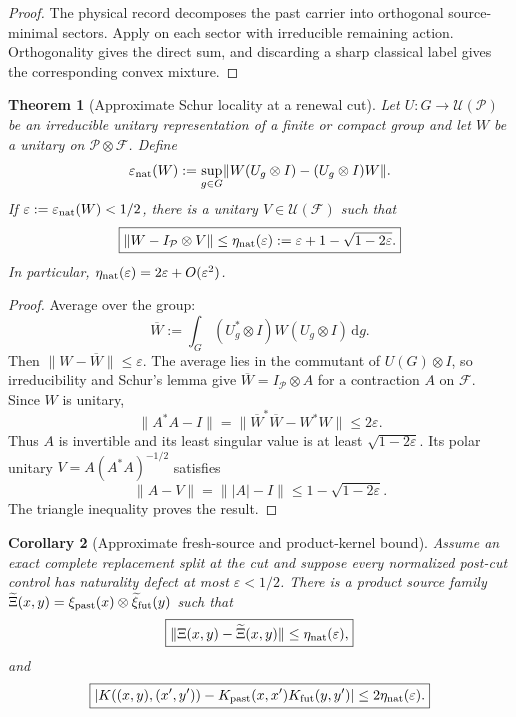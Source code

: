 \documentclass[11pt]{article}
\newtheorem{theorem}{Theorem}[section]
\newtheorem{corollary}[theorem]{Corollary}
\theoremstyle{definition}
\theoremstyle{remark}
\newcommand{\norm}[1]{\lVert#1\rVert}
\newcommand{\dd}{\mathrm d}
\begin{document}
\begin{proof}
The physical record decomposes the past carrier into orthogonal source-minimal
sectors.  Apply  on each sector with
irreducible remaining action.  Orthogonality gives the direct sum, and
discarding a sharp classical label gives the corresponding convex mixture.
\end{proof}

\begin{theorem}[Approximate Schur locality at a renewal cut]
\label{thm:approximate-cut-locality-master}
Let $U:G\to\mathcal U(\mathcal P)$ be an irreducible unitary representation of
a finite or compact group and let $W$ be a unitary on
$\mathcal P\otimes\mathcal F$.  Define
\[
  \varepsilon_{\rm nat}(W)
  :=\sup_{g\in G}
  \norm{W(U_g\otimes I)-(U_g\otimes I)W}.
\]
If $\varepsilon:=\varepsilon_{\rm nat}(W)<1/2$, there is a unitary
$V\in\mathcal U(\mathcal F)$ such that
\begin{equation}
  \boxed{
  \norm{W-I_{\mathcal P}\otimes V}
  \le
  \eta_{\rm nat}(\varepsilon)
  :=\varepsilon+1-\sqrt{1-2\varepsilon}.}
  \label{eq:approximate-cut-locality-master}
\end{equation}
In particular, $\eta_{\rm nat}(\varepsilon)=2\varepsilon+O(\varepsilon^2)$.
\end{theorem}

\begin{proof}
Average over the group:
\[
  \overline W
  :=\int_G(U_g^*\otimes I)W(U_g\otimes I)\,\dd g.
\]
Then $\norm{W-\overline W}\le\varepsilon$.  The average lies in the
commutant of $U(G)\otimes I$, so irreducibility and Schur's lemma give
$\overline W=I_{\mathcal P}\otimes A$ for a contraction $A$ on $\mathcal F$.
Since $W$ is unitary,
\[
  \norm{A^*A-I}
  =\norm{\overline W^*\overline W-W^*W}
  \le2\varepsilon.
\]
Thus $A$ is invertible and its least singular value is at least
$\sqrt{1-2\varepsilon}$.  Its polar unitary
$V=A(A^*A)^{-1/2}$ satisfies
\[
  \norm{A-V}=\norm{|A|-I}
  \le1-\sqrt{1-2\varepsilon}.
\]
The triangle inequality proves the result.
\end{proof}

\begin{corollary}[Approximate fresh-source and product-kernel bound]
\label{cor:approximate-cut-product-master}
Assume an exact complete replacement split at the cut and suppose every
normalized post-cut control has naturality defect at most
$\varepsilon<1/2$.  There is a product source family
$\widetilde\Xi(x,y)=\xi_{\rm past}(x)\otimes
\widetilde\xi_{\rm fut}(y)$ such that
\begin{equation}
  \boxed{\norm{\Xi(x,y)-\widetilde\Xi(x,y)}
  \le\eta_{\rm nat}(\varepsilon),}
  \label{eq:approximate-source-product-master}
\end{equation}
and
\begin{equation}
  \boxed{
  \left|
  K((x,y),(x',y'))
  -K_{\rm past}(x,x')K_{\rm fut}(y,y')
  \right|
  \le2\eta_{\rm nat}(\varepsilon).}
  \label{eq:approximate-kernel-product-master}
\end{equation}
\end{corollary}
\end{document}
